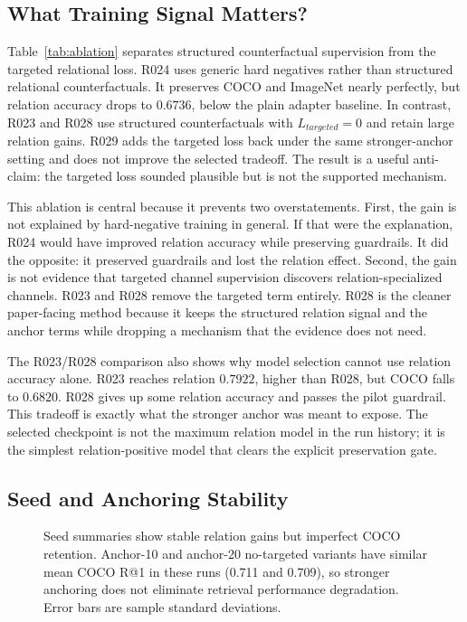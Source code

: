 

\subsection{What Training Signal Matters?}

Table~\ref{tab:ablation} separates structured counterfactual supervision from the targeted relational loss. R024 uses generic hard negatives rather than structured relational counterfactuals. It preserves COCO and ImageNet nearly perfectly, but relation accuracy drops to $0.6736$, below the plain adapter baseline. In contrast, R023 and R028 use structured counterfactuals with $L_{targeted}=0$ and retain large relation gains. R029 adds the targeted loss back under the same stronger-anchor setting and does not improve the selected tradeoff. The result is a useful anti-claim: the targeted loss sounded plausible but is not the supported mechanism.

This ablation is central because it prevents two overstatements. First, the gain is not explained by hard-negative training in general. If that were the explanation, R024 would have improved relation accuracy while preserving guardrails. It did the opposite: it preserved guardrails and lost the relation effect. Second, the gain is not evidence that targeted channel supervision discovers relation-specialized channels. R023 and R028 remove the targeted term entirely. R028 is the cleaner paper-facing method because it keeps the structured relation signal and the anchor terms while dropping a mechanism that the evidence does not need.

The R023/R028 comparison also shows why model selection cannot use relation accuracy alone. R023 reaches relation $0.7922$, higher than R028, but COCO falls to $0.6820$. R028 gives up some relation accuracy and passes the pilot guardrail. This tradeoff is exactly what the stronger anchor was meant to expose. The selected checkpoint is not the maximum relation model in the run history; it is the simplest relation-positive model that clears the explicit preservation gate.



\subsection{Seed and Anchoring Stability}

\begin{figure}[t]
    \centering
    
    \caption{Seed summaries show stable relation gains but imperfect COCO retention. Anchor-10 and anchor-20 no-targeted variants have similar mean COCO R@1 in these runs (0.711 and 0.709), so stronger anchoring does not eliminate retrieval performance degradation. Error bars are sample standard deviations.}
    \label{fig:seed_anchor}
\end{figure}

